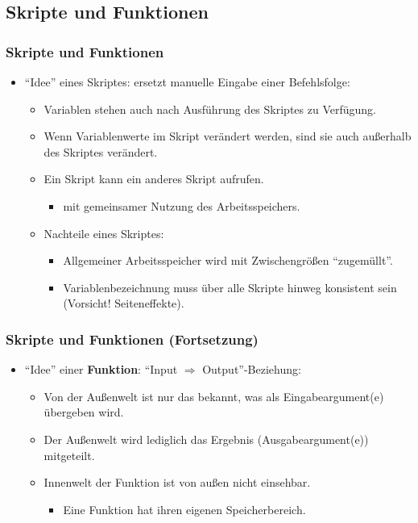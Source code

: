   \subsection{Skripte und Funktionen}
  \begin{frame}
      \frametitle{Skripte und Funktionen}
      \begin{itemize}
        \item ``Idee'' eines Skriptes: ersetzt manuelle Eingabe einer Befehlsfolge:
        \begin{itemize}
          \item Variablen stehen auch nach Ausführung des Skriptes zu Verfügung.
          \item Wenn Variablenwerte im Skript verändert werden, sind sie auch außerhalb des Skriptes verändert.
          \item Ein Skript kann ein anderes Skript aufrufen.
          \begin{itemize}
            \item mit gemeinsamer Nutzung des Arbeitsspeichers.
          \end{itemize}
          \item Nachteile eines Skriptes:
          \begin{itemize}
            \item Allgemeiner Arbeitsspeicher wird mit Zwischengrößen ``zugemüllt''.
            \item Variablenbezeichnung muss über alle Skripte hinweg konsistent sein (\alert{Vorsicht!} Seiteneffekte).
          \end{itemize}
        \end{itemize}
      \end{itemize}
  \end{frame}

  \begin{frame}
      \frametitle{Skripte und Funktionen (Fortsetzung)}
      \begin{itemize}
        \item ``Idee'' einer \textbf{Funktion}: ``Input $\Rightarrow$ Output''-Beziehung:
        \begin{itemize}
          \item Von der Außenwelt ist nur das bekannt, was als Eingabeargument(e) übergeben wird.
          \item Der Außenwelt wird lediglich das Ergebnis (Ausgabeargument(e)) mitgeteilt.
          \item Innenwelt der Funktion ist von außen nicht einsehbar.
          \begin{itemize}
            \item Eine Funktion hat ihren eigenen Speicherbereich.
          \end{itemize}
        \end{itemize}
      \end{itemize}
  \end{frame}

